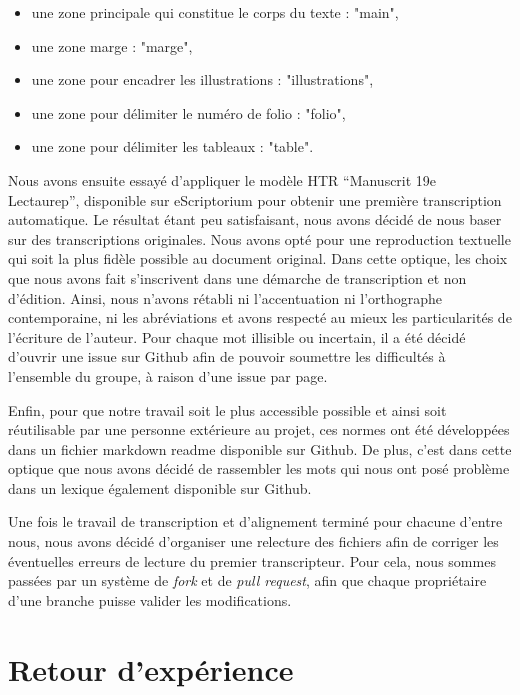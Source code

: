 \documentclass{article}
\begin{document}
\begin{itemize}
\item une zone principale qui constitue le corps du texte : "main",
\item une zone marge : "marge",
\item  une zone pour encadrer les illustrations : "illustrations",
\item une zone pour délimiter le numéro de folio : "folio",
\item une zone pour délimiter les tableaux : "table".
\end{itemize}

Nous avons ensuite essayé d’appliquer le modèle HTR “Manuscrit 19e Lectaurep”, disponible sur eScriptorium pour obtenir une première transcription automatique. Le résultat étant peu satisfaisant, nous avons décidé de nous baser sur des transcriptions originales. Nous avons opté pour une reproduction textuelle qui soit la plus fidèle possible au document original. Dans cette optique, les choix que nous avons fait s’inscrivent dans une démarche de transcription et non d’édition. Ainsi, nous n’avons rétabli ni l’accentuation ni l’orthographe contemporaine, ni les abréviations et avons respecté au mieux les particularités de l’écriture de l’auteur. Pour chaque mot illisible ou incertain, il a été décidé d’ouvrir une issue sur Github afin de pouvoir soumettre les difficultés à l’ensemble du groupe, à raison d’une issue par page.


Enfin, pour que notre travail soit le plus accessible possible et ainsi soit réutilisable par une personne extérieure au projet, ces normes ont été développées dans un fichier markdown readme disponible sur Github. De plus, c’est dans cette optique que nous avons décidé de rassembler les mots qui nous ont posé problème dans un lexique également disponible sur Github.


Une fois le travail de transcription et d’alignement terminé pour chacune d’entre nous, nous avons décidé d’organiser une relecture des fichiers afin de corriger les éventuelles erreurs de lecture du premier transcripteur. Pour cela, nous sommes passées par un système de \textit{fork} et de \textit{pull request}, afin que chaque propriétaire d’une branche puisse valider les modifications.




\section{Retour d'expérience}
\end{document}
